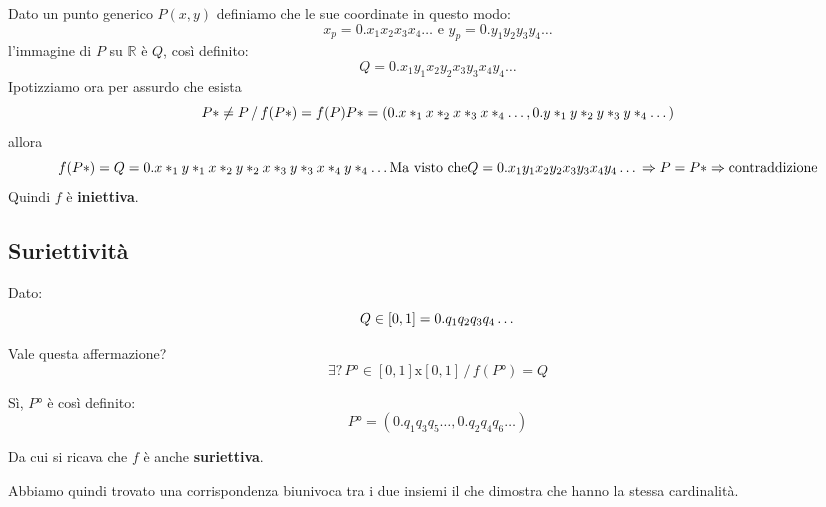 \documentclass[../dimostrazioni]{subfiles}
\begin{document}
            Dato un punto generico \(P (x,y) \) definiamo che le sue coordinate in questo modo:
            \[
                x_p = 0.x_1 x_2 x_3 x_4 \dots \, \, \text{e} \, \, y_p = 0.y_1 y_2 y_3 y_ 4 \dots    
            \]
            l'immagine di \(P\) su \( \mathbb{R} \) è \( Q \), così definito:
            \[
                Q = 0.x_1 y_1 x_2 y_2 x_3 y_3 x_4 y_ 4 \dots    
            \]
            Ipotizziamo ora per assurdo che esista 
            \[ 
                P* \neq P \, / \, f(P*) = f(P)\\
                P* = (0.x*_1 x*_2 x*_3 x*_4 \dots , 0.y*_1 y*_2 y*_3 y*_4 \dots)\\
            \]
            allora
            \[
                f(P*) = Q = 0.x*_1 y*_1 x*_2 y*_2 x*_3 y*_3 x*_4 y*_4 \dots\\
                \text{Ma visto che}\\
                Q = 0.x_1 y_1 x_2 y_2 x_3 y_3 x_4 y_ 4 \dots\\
                \Rightarrow P = P* \Rightarrow \text{contraddizione}  
            \]
            Quindi \(f\) è \textbf{iniettiva}.

            \subsection*{Suriettività}

            Dato:
            \[
                Q \in [0,1] = 0.q_1 q_2 q_3 q_4 \dots\\ 
            \]

            Vale questa affermazione?
            \[
                \exists \text{?} \, P° \in [0,1]\text{x}[0,1] \, / \, f(P°) = Q
            \]

            Sì, \(P°\) è così definito:
            \[
                P° = (0.q_1 q_3 q_5 \dots, 0.q_2 q_4 q_6 \dots)    
            \]

            Da cui si ricava che \(f\) è anche \textbf{suriettiva}.

            Abbiamo quindi trovato una corrispondenza biunivoca tra i due insiemi il che dimostra che hanno la stessa cardinalità.
            
\end{document}
